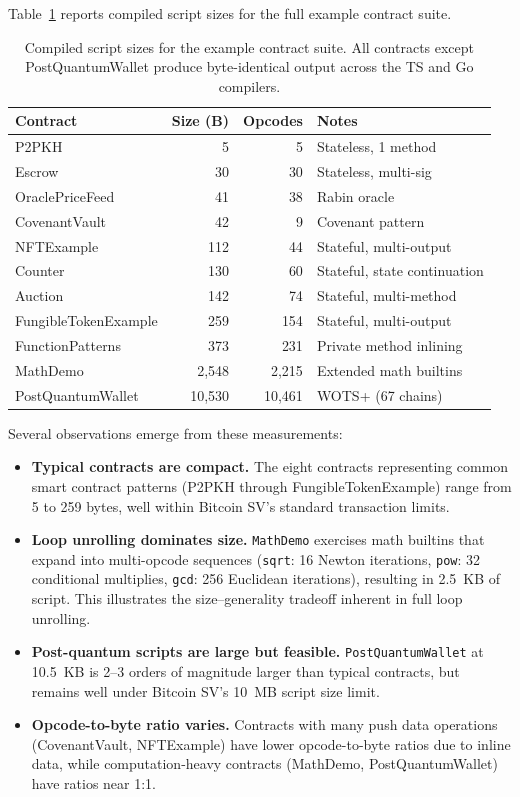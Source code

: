\documentclass[11pt,a4paper]{article}
\begin{document}
Table~\ref{tab:sizes} reports compiled script sizes for the full example
contract suite.

\begin{table}[h]
\centering
\small
\begin{tabular}{@{}lrrl@{}}
\toprule
\textbf{Contract} & \textbf{Size (B)} & \textbf{Opcodes} & \textbf{Notes} \\
\midrule
P2PKH & 5 & 5 & Stateless, 1 method \\
Escrow & 30 & 30 & Stateless, multi-sig \\
OraclePriceFeed & 41 & 38 & Rabin oracle \\
CovenantVault & 42 & 9 & Covenant pattern \\
NFTExample & 112 & 44 & Stateful, multi-output \\
Counter & 130 & 60 & Stateful, state continuation \\
Auction & 142 & 74 & Stateful, multi-method \\
FungibleTokenExample & 259 & 154 & Stateful, multi-output \\
FunctionPatterns & 373 & 231 & Private method inlining \\
MathDemo & 2,548 & 2,215 & Extended math builtins \\
PostQuantumWallet & 10,530 & 10,461 & WOTS+ (67 chains) \\
\bottomrule
\end{tabular}
\caption{Compiled script sizes for the example contract suite.
  All contracts except PostQuantumWallet produce byte-identical output
  across the TS and Go compilers.}
\label{tab:sizes}
\end{table}

Several observations emerge from these measurements:

\begin{itemize}[nosep]
  \item \textbf{Typical contracts are compact.} The eight contracts
    representing common smart contract patterns (P2PKH through
    FungibleTokenExample) range from 5 to 259 bytes, well within
    Bitcoin SV's standard transaction limits.
  \item \textbf{Loop unrolling dominates size.} \texttt{MathDemo}
    exercises math builtins that expand into multi-opcode sequences
    (\texttt{sqrt}: 16 Newton iterations, \texttt{pow}: 32 conditional
    multiplies, \texttt{gcd}: 256 Euclidean iterations), resulting in
    2.5~KB of script. This illustrates the size--generality tradeoff
    inherent in full loop unrolling.
  \item \textbf{Post-quantum scripts are large but feasible.}
    \texttt{PostQuantumWallet} at 10.5~KB is 2--3 orders of magnitude
    larger than typical contracts, but remains well under Bitcoin SV's
    10~MB script size limit.
  \item \textbf{Opcode-to-byte ratio varies.} Contracts with many push
    data operations (CovenantVault, NFTExample) have lower opcode-to-byte
    ratios due to inline data, while computation-heavy contracts
    (MathDemo, PostQuantumWallet) have ratios near 1:1.
\end{itemize}
\end{document}
